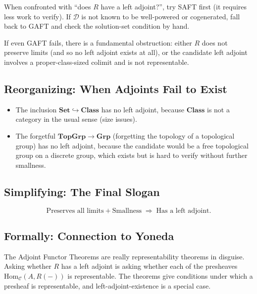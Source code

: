 When confronted with ``does $R$ have a left adjoint?'', try SAFT first
(it requires less work to verify). If $\mathcal{D}$ is not known to be
well-powered or cogenerated, fall back to GAFT and check the
solution-set condition by hand.

If even GAFT fails, there is a fundamental obstruction: either $R$ does
not preserve limits (and so no left adjoint exists at all), or the
candidate left adjoint involves a proper-class-sized colimit and is not
representable.

\subsection{Reorganizing: When Adjoints Fail to Exist}

\begin{itemize}
  \item The inclusion $\mathbf{Set} \hookrightarrow \mathbf{Class}$ has
        no left adjoint, because $\mathbf{Class}$ is not a category in
        the usual sense (size issues).
  \item The forgetful $\mathbf{TopGrp} \to \mathbf{Grp}$ (forgetting the
        topology of a topological group) has no left adjoint, because
        the candidate would be a free topological group on a discrete
        group, which exists but is hard to verify without further
        smallness.
\end{itemize}

\subsection{Simplifying: The Final Slogan}

\begin{equation*}
  \boxed{\;\;
    \text{Preserves all limits} + \text{Smallness}
    \;\Rightarrow\;
    \text{Has a left adjoint}.
  \;\;}
\end{equation*}

\subsection{Formally: Connection to Yoneda}

The Adjoint Functor Theorems are really representability theorems in
disguise. Asking whether $R$ has a left adjoint is asking whether each
of the presheaves $\mathrm{Hom}_\mathcal{C}(A, R(-))$ is representable.
The theorems give conditions under which a presheaf is representable, and
left-adjoint-existence is a special case.


